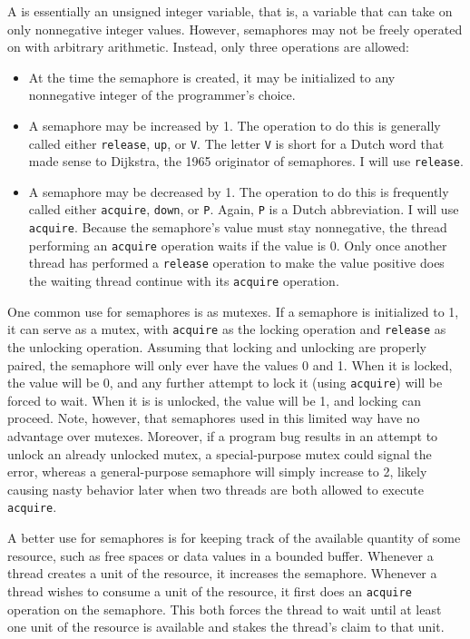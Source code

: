 A  is essentially an unsigned integer variable, that is, a
variable that can take on only nonnegative integer values.  However,
semaphores may not be freely operated on with arbitrary arithmetic.
Instead, only three operations are allowed:
\begin{itemize}
\item
At the time the semaphore is created, it may be initialized to any
nonnegative integer of the programmer's choice.
\item
A semaphore may be increased by 1.  The operation to do this is
generally called either \verb|release|, \verb|up|, or \verb|V|.  The letter \verb|V| is short
for a Dutch word that made sense to Dijkstra, the 1965 originator of
semaphores.  I will use \verb|release|.
\item
A semaphore may be decreased by 1.  The operation to do this is
frequently called either \verb|acquire|, \verb|down|, or \verb|P|.  Again, \verb|P| is
a Dutch abbreviation.  I will use \verb|acquire|.  Because the
semaphore's value must stay nonnegative, the thread performing an
\verb|acquire| operation waits if the value is 0.  Only once another
thread has performed a \verb|release| operation to make the value positive
does the waiting thread continue with its \verb|acquire| operation.
\end{itemize}

One common use for semaphores is as mutexes.
If a semaphore is initialized to 1, it can serve as a mutex,
with \verb|acquire| as the locking operation and \verb|release| as the
unlocking operation.  Assuming that locking and unlocking are properly
paired, the semaphore will only ever have the values 0 and 1.  When it
is locked, the value will be 0, and any further attempt to lock it
(using \verb|acquire|) will be forced to wait.  When it is is unlocked,
the value will be 1, and locking can proceed.  Note, however, that
semaphores used in this limited way have no advantage over mutexes.
Moreover, if a program bug results in an attempt to unlock an already
unlocked mutex, a special-purpose mutex could signal the error,
whereas a general-purpose semaphore will simply increase to 2, likely
causing nasty behavior later when two threads are both allowed to execute
\verb|acquire|.

A better use for semaphores is for keeping track of the available
quantity of some resource, such as free spaces or
data values in a bounded buffer. Whenever a thread creates a unit of
the resource, it increases the semaphore.  Whenever a thread wishes to
consume a unit of the resource, it first does an \verb|acquire| operation
on the semaphore.  This both forces the thread to wait until at least
one unit of the resource is available and stakes the thread's claim to
that unit.

